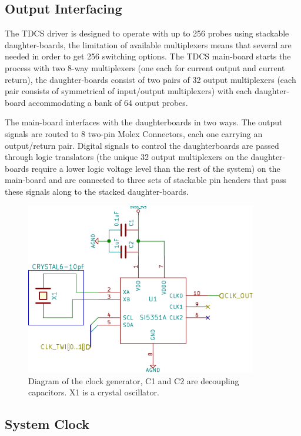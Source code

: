 \subsection{Output Interfacing}

The TDCS driver is designed to operate with up to 256 probes using stackable daughter-boards, the limitation of available multiplexers means that several are needed in order to get 256 switching options. The TDCS main-board starts the process with two 8-way multiplexers (one each for current output and current return), the daughter-boards consist of two pairs of 32 output multiplexers (each pair consists of symmetrical of input/output multiplexers) with each daughter-board accommodating a bank of 64 output probes. 

The main-board interfaces with the daughterboards in two ways. The output signals are routed to 8 two-pin Molex Connectors, each one carrying an output/return pair. Digital signals to control the daughterboards are passed through logic translators (the unique 32 output multiplexers on the daughter-boards require a lower logic voltage level than the rest of the system) on  the main-board and are connected to three sets of stackable pin headers that pass these signals along to the stacked daughter-boards. 


\begin{figure}[h]
\centering
\includegraphics[width=0.9\textwidth]{../assets/images/Clock/clocksch}
\caption{Diagram of the clock generator, C1 and C2 are decoupling capacitors. X1 is a crystal oscillator. }
\label{fig:system_clock}
\end{figure}

\subsection{System Clock}

